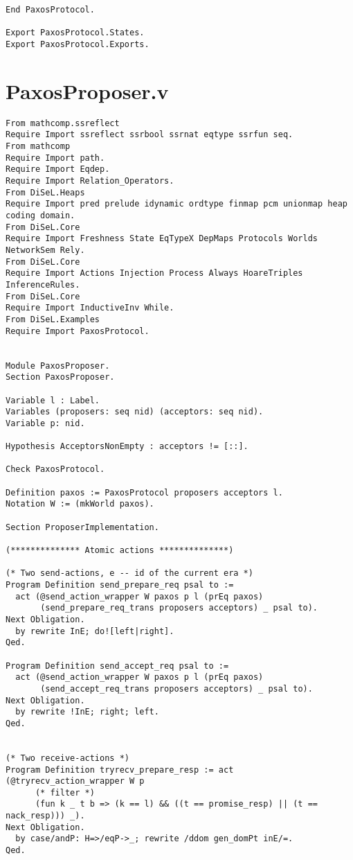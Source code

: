 \begin{landscape}
\begin{multicols*}{2}
\begin{lstlisting}[style=SourceCodeListing]
End PaxosProtocol.

Export PaxosProtocol.States.
Export PaxosProtocol.Exports.
\end{lstlisting}
\end{multicols*}

\newpage

\section{PaxosProposer.v}
\begin{multicols*}{2}
\begin{lstlisting}[style=SourceCodeListing]
From mathcomp.ssreflect
Require Import ssreflect ssrbool ssrnat eqtype ssrfun seq.
From mathcomp
Require Import path.
Require Import Eqdep.
Require Import Relation_Operators.
From DiSeL.Heaps
Require Import pred prelude idynamic ordtype finmap pcm unionmap heap coding domain.
From DiSeL.Core
Require Import Freshness State EqTypeX DepMaps Protocols Worlds NetworkSem Rely.
From DiSeL.Core
Require Import Actions Injection Process Always HoareTriples InferenceRules.
From DiSeL.Core
Require Import InductiveInv While.
From DiSeL.Examples
Require Import PaxosProtocol.


Module PaxosProposer.
Section PaxosProposer.

Variable l : Label.
Variables (proposers: seq nid) (acceptors: seq nid).
Variable p: nid.

Hypothesis AcceptorsNonEmpty : acceptors != [::].

Check PaxosProtocol.

Definition paxos := PaxosProtocol proposers acceptors l.
Notation W := (mkWorld paxos).

Section ProposerImplementation.

(************** Atomic actions **************)

(* Two send-actions, e -- id of the current era *)
Program Definition send_prepare_req psal to :=
  act (@send_action_wrapper W paxos p l (prEq paxos)
       (send_prepare_req_trans proposers acceptors) _ psal to).
Next Obligation.
  by rewrite InE; do![left|right].
Qed.

Program Definition send_accept_req psal to :=
  act (@send_action_wrapper W paxos p l (prEq paxos)
       (send_accept_req_trans proposers acceptors) _ psal to).
Next Obligation.
  by rewrite !InE; right; left.
Qed.


(* Two receive-actions *)
Program Definition tryrecv_prepare_resp := act (@tryrecv_action_wrapper W p
      (* filter *)
      (fun k _ t b => (k == l) && ((t == promise_resp) || (t == nack_resp))) _).
Next Obligation.
  by case/andP: H=>/eqP->_; rewrite /ddom gen_domPt inE/=.
Qed.



\end{lstlisting}
\end{multicols*}
\end{landscape}
